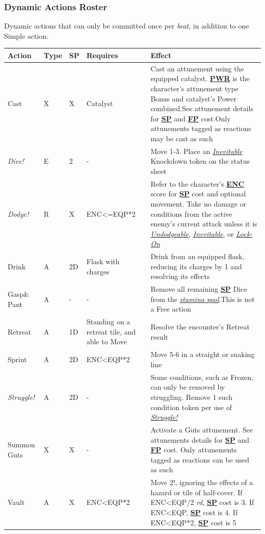 \documentclass[12pt]{article}
\newcommand{\refto}[1]{\hyperlink{#1}{\textbf{#1}}}
\newcommand{\reftoit}[1]{\hyperlink{#1}{\emph{#1}}}
\begin{document}
\subsubsection{Dynamic Actions Roster}
Dynamic actions that can only be committed once per \emph{beat}, in addition to one Simple action.\\
\begin{center}
\begin{tabularx}{\textwidth}{p{}p{}p{}p{}p{}}
\hline
\textbf{Action} & \textbf{Type} & \textbf{SP} & \textbf{Requires} & \textbf{Effect}\setcounter{rownum}{0}\\
\hline
Cast & X & X & Catalyst & Cast an attunement using the equipped catalyst. \refto{PWR} is the character’s attunement type Bonus and catalyst’s Power combined.\newline See attunement details for \refto{SP} and \refto{FP} cost.\newline Only attunements tagged as reactions may be cast as such\\
\emph{Dive!} & E & 2 & - & Move 1-3.\newline
Place an \reftoit{Inevitable} Knockdown token on the status sheet\\
\emph{Dodge!}\hypertarget{Dodge!}{} & R & X & ENC<=EQP*2 & Refer to the character’s \refto{ENC} score for \refto{SP} cost and optional movement.\newline
Take no damage or conditions from the active enemy’s current attack unless it is \reftoit{Undodgeable}, \reftoit{Inevitable}, or \reftoit{Lock-On}\\
Drink & A & 2D & Flask with charges & Drink from an equipped flask, reducing its charges by 1 and resolving its effects\\
Gasp\newline \& Pant & A & - & - & Remove all remaining \refto{SP} Dice from the \reftoit{stamina pool}.\newline This is not a Free action\\
Retreat & A & 1D & Standing on a retreat tile, and able to Move & Resolve the encounter’s Retreat result\\
Sprint & A & 2D & ENC<EQP*2 & Move 5-6 in a straight or snaking line\\
\emph{Struggle!}\hypertarget{Struggle!}{} & A & 2D & - & Some conditions, such as Frozen, can only be removed by struggling. Remove 1 such condition token per use of \reftoit{Struggle!}\\
Summon Guts & X & X & - & Activate a Guts attunement. See attunements details for \refto{SP} and \refto{FP} cost. Only attunements tagged as reactions can be used as such\\
Vault & A & X & ENC<EQP*2 & Move 2!, ignoring the effects of a hazard or tile of half-cover.\newline
If ENC<EQP/2 \emph{rd}, \refto{SP} cost is 3.\newline
If ENC<EQP, \refto{SP} cost is 4.\newline
If ENC<EQP*2, \refto{SP} cost is 5\\
\hline
\end{tabularx}
\end{center}
\end{document}
